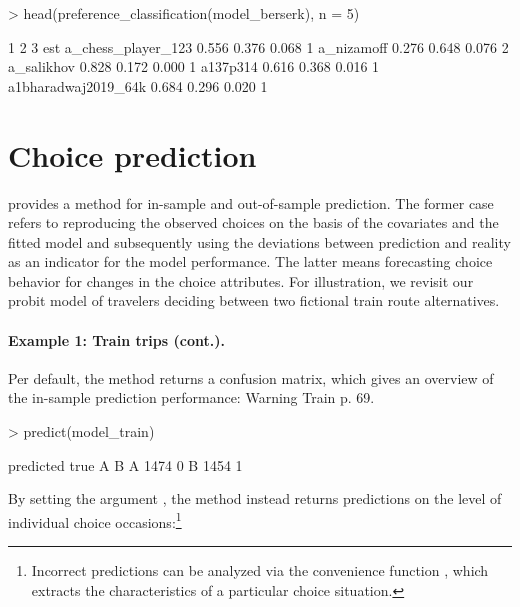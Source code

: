 \documentclass[article,shortnames]{jss}
\newcommand{\fct}[1]{\code{#1()}}
\begin{document}
\begin{Schunk}
\begin{Sinput}
> head(preference_classification(model_berserk), n = 5)
\end{Sinput}
\begin{Soutput}
                        1     2     3 est
a_chess_player_123  0.556 0.376 0.068   1
a_nizamoff          0.276 0.648 0.076   2
a_salikhov          0.828 0.172 0.000   1
a137p314            0.616 0.368 0.016   1
a1bharadwaj2019_64k 0.684 0.296 0.020   1
\end{Soutput}
\end{Schunk}

\section{Choice prediction} \label{sec:choice_prediction}

 provides a \fct{predict} method for in-sample and out-of-sample prediction. The former case refers to reproducing the observed choices on the basis of the covariates and the fitted model and subsequently using the deviations between prediction and reality as an indicator for the model performance. The latter means forecasting choice behavior for changes in the choice attributes. For illustration, we revisit our probit model of travelers deciding between two fictional train route alternatives.

\paragraph{Example 1: Train trips (cont.).}

Per default, the \fct{predict} method returns a confusion matrix, which gives an overview of the in-sample prediction performance: Warning Train p. 69.

\begin{Schunk}
\begin{Sinput}
> predict(model_train)
\end{Sinput}
\begin{Soutput}
    predicted
true    A    B
   A 1474    0
   B 1454    1
\end{Soutput}
\end{Schunk}

By setting the argument , the method instead returns predictions on the level of individual choice occasions:\footnote{Incorrect predictions can be analyzed via the convenience function \fct{get\_cov}, which extracts the characteristics of a particular choice situation.}
\end{document}
